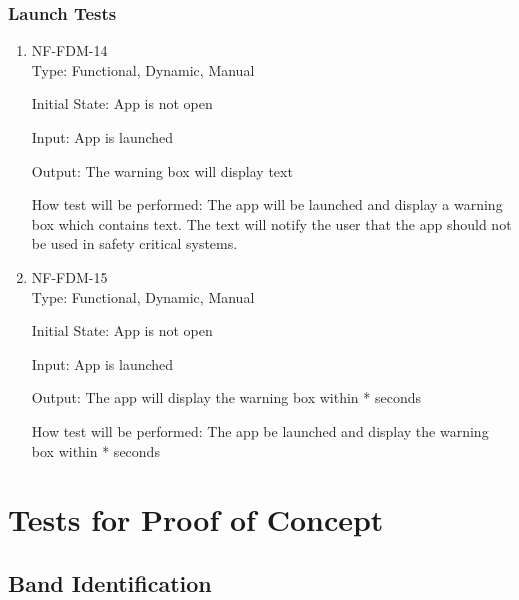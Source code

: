 \documentclass[12pt, titlepage]{article}
\begin{document}
\subsubsection{Launch Tests}
\begin{enumerate}
\item{NF-FDM-14\\}
Type: Functional, Dynamic, Manual
					
Initial State: 
App is not open
					
Input: 
App is launched
					
Output: 
The warning box will display text
					
How test will be performed: 
The app will be launched and display a warning box which contains text. The text will notify the user that the app should not be used in safety critical systems.

\item{NF-FDM-15\\}
Type: Functional, Dynamic, Manual
					
Initial State: 
App is not open
					
Input: 
App is launched
					
Output: 
The app will display the warning box within * seconds
					
How test will be performed: 
The app be launched and display the warning box within * seconds


\end{enumerate}




\section{Tests for Proof of Concept}
\subsection{Band Identification}
		
\end{document}
